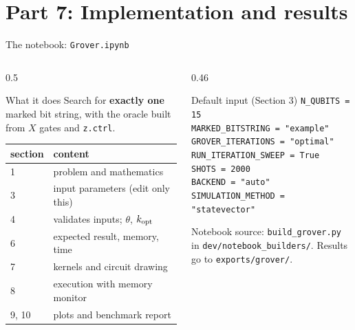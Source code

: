 \documentclass[aspectratio=169,11pt]{beamer}
\newcommand{\hl}[1]{{\color{qorange}\textbf{#1}}}
\begin{document}
\section{Part 7: Implementation and results}
\begin{frame}{The notebook: \texttt{Grover.ipynb}}
  \begin{columns}[T]
    \begin{column}{0.5\textwidth}
      \begin{block}{What it does}
        Search for \hl{exactly one} marked bit string, with the oracle built from $X$ gates and \texttt{z.ctrl}.
      \end{block}
      \small
      \begin{tabular}{ll}
        \toprule
        section & content\\
        \midrule
        1 & problem and mathematics\\
        3 & input parameters (edit only this)\\
        4 & validates inputs; $\theta$, $k_{\rm opt}$\\
        6 & expected result, memory, time\\
        7 & kernels and circuit drawing\\
        8 & execution with memory monitor\\
        9, 10 & plots and benchmark report\\
        \bottomrule
      \end{tabular}
    \end{column}
    \begin{column}{0.46\textwidth}
      \begin{exampleblock}{Default input (Section 3)}
        \small
        \texttt{N\_QUBITS = 15}\\
        \texttt{MARKED\_BITSTRING = "example"}\\
        \texttt{GROVER\_ITERATIONS = "optimal"}\\
        \texttt{RUN\_ITERATION\_SWEEP = True}\\
        \texttt{SHOTS = 2000}\\
        \texttt{BACKEND = "auto"}\\
        \texttt{SIMULATION\_METHOD = "statevector"}
      \end{exampleblock}
      \small Notebook source: \texttt{build\_grover.py} in \texttt{dev/notebook\_builders/}. Results go to \texttt{exports/grover/}.
    \end{column}
  \end{columns}
\end{frame}
\end{document}
